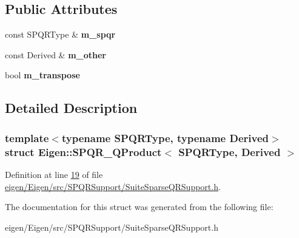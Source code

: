 \subsection*{Public Attributes}
\begin{DoxyCompactItemize}
\item 
\mbox{\label{struct_eigen_1_1_s_p_q_r___q_product_ac60ddf601322a2713bedf9cccbff5049}} 
const S\+P\+Q\+R\+Type \& {\bfseries m\+\_\+spqr}
\item 
\mbox{\label{struct_eigen_1_1_s_p_q_r___q_product_aaa4218688945f42b11ccdc0e77a18c51}} 
const Derived \& {\bfseries m\+\_\+other}
\item 
\mbox{\label{struct_eigen_1_1_s_p_q_r___q_product_a0470f0e6780dcd1185496d00e8281535}} 
bool {\bfseries m\+\_\+transpose}
\end{DoxyCompactItemize}


\subsection{Detailed Description}
\subsubsection*{template$<$typename S\+P\+Q\+R\+Type, typename Derived$>$\newline
struct Eigen\+::\+S\+P\+Q\+R\+\_\+\+Q\+Product$<$ S\+P\+Q\+R\+Type, Derived $>$}



Definition at line \hyperlink{eigen_2_eigen_2src_2_s_p_q_r_support_2_suite_sparse_q_r_support_8h_source_l00019}{19} of file \hyperlink{eigen_2_eigen_2src_2_s_p_q_r_support_2_suite_sparse_q_r_support_8h_source}{eigen/\+Eigen/src/\+S\+P\+Q\+R\+Support/\+Suite\+Sparse\+Q\+R\+Support.\+h}.



The documentation for this struct was generated from the following file\+:\begin{DoxyCompactItemize}
\item 
eigen/\+Eigen/src/\+S\+P\+Q\+R\+Support/\+Suite\+Sparse\+Q\+R\+Support.\+h\end{DoxyCompactItemize}
